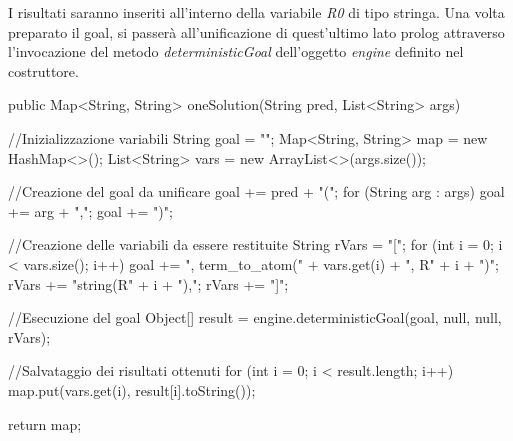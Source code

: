 I risultati saranno inseriti all'interno della variabile \emph{R0} di tipo stringa.
Una volta preparato il goal, si passerà all'unificazione di quest'ultimo lato prolog attraverso l'invocazione del metodo \emph{deterministicGoal} dell'oggetto \emph{engine} definito nel costruttore.

\begin{javacode}
   public Map<String, String> oneSolution(String pred, List<String> args){
   
   //Inizializzazione variabili
     String goal = "";
     Map<String, String> map = new HashMap<>();
     List<String> vars = new ArrayList<>(args.size());

   //Creazione del goal da unificare
     goal += pred + "(";
     for (String arg : args)
       goal += arg + ",";
     goal += ")";
       
   //Creazione delle variabili da essere restituite
     String rVars = "[";
     for (int i = 0; i < vars.size(); i++) {
       goal += ", term_to_atom(" + vars.get(i) + ", R" + i + ")";
       rVars += "string(R" + i + "),";
     }
     rVars += "]";

   //Esecuzione del goal
     Object[] result = engine.deterministicGoal(goal, null, null, rVars);
     
   //Salvataggio dei risultati ottenuti
     for (int i = 0; i < result.length; i++) {
       map.put(vars.get(i), result[i].toString());
     }
      
     return map;
   }
\end{javacode}
\clearpage